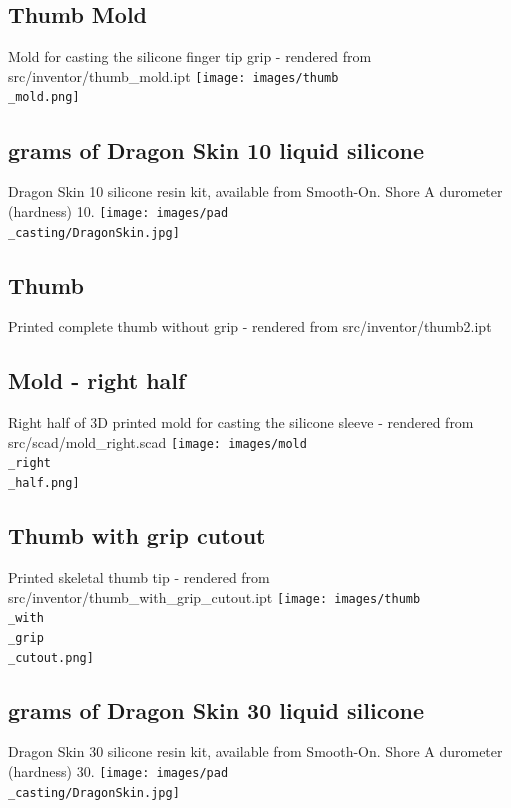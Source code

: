 \documentclass[11pt]{article}
\begin{document}
\hypertarget{thing_thumb\_mold}{\subsection{Thumb Mold}}
Mold for casting the silicone finger tip grip - rendered from src/inventor/thumb_mold.ipt
\texttt{[image: images/thumb\\\_mold.png]}

\hypertarget{thing_g\_dragon\_skin\_10}{\subsection{grams of Dragon Skin 10 liquid silicone}}
Dragon Skin 10 silicone resin kit, available from Smooth-On. Shore A durometer (hardness) 10.
\texttt{[image: images/pad\\\_casting/DragonSkin.jpg]}

\hypertarget{thing_thumb2}{\subsection{Thumb}}
Printed complete thumb without grip - rendered from src/inventor/thumb2.ipt

\hypertarget{thing_mold\_right\_half}{\subsection{Mold - right half}}
Right half of 3D printed mold for casting the silicone sleeve - rendered from src/scad/mold_right.scad
\texttt{[image: images/mold\\\_right\\\_half.png]}

\hypertarget{thing_thumb\_with\_grip\_cutout}{\subsection{Thumb with grip cutout}}
Printed skeletal thumb tip - rendered from src/inventor/thumb_with_grip_cutout.ipt
\texttt{[image: images/thumb\\\_with\\\_grip\\\_cutout.png]}

\hypertarget{thing_g\_dragon\_skin\_30}{\subsection{grams of Dragon Skin 30 liquid silicone}}
Dragon Skin 30 silicone resin kit, available from Smooth-On. Shore A durometer (hardness) 30.
\texttt{[image: images/pad\\\_casting/DragonSkin.jpg]}
\end{document}
